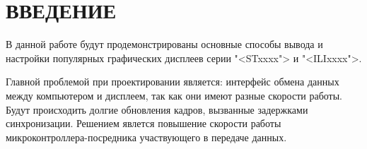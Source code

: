 \chapter*{ВВЕДЕНИЕ}

	В данной работе будут продемонстрированы основные способы вывода и настройки популярных графических дисплеев серии "<STxxxx"> и "<ILIxxxx">.
	
	Главной проблемой при проектировании является: интерфейс обмена данных между компьютером и дисплеем, так как они имеют разные скорости работы. Будут происходить долгие обновления кадров, вызванные задержками синхронизации. Решением явлется повышение скорости работы микроконтроллера-посредника участвующего в передаче данных.
	

	
	
	

